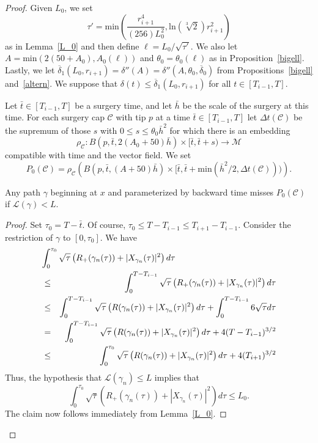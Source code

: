 \begin{proof}
Given $L_0$, we set
$$\tau'=\mathrm{min}\left(\frac{r_{i+1}^4}{(256)L_0^2},\mathrm{ln}(\sqrt[3]{2})r_{i+1}^2\right)$$
as in Lemma~\ref{L_0} and then define $\ell=L_0/\sqrt{\tau'}$. We
also let $A=\mathrm{min}(2(50+A_0),A_0(\ell))$ and
$\theta_0=\theta_0(\ell)$ as in Proposition~\ref{bigell}. Lastly, we
let
$\overline\delta_1(L_0,r_{i+1})=\delta''(A)=\delta''(A,\theta_0,\overline\delta_0)$
from Propositions~\ref{bigell} and~\ref{altern}. We suppose that
$\delta(t)\le \overline\delta_1(L_0,r_{i+1})$ for all $t\in
[T_{i-1},T]$.

Let $\bar t\in [T_{i-1},T]$ be a surgery time, and let $\bar h$ be
the scale of the surgery at this time. For each surgery cap
${\mathcal C}$ with tip $p$ at a time $\bar t\in [T_{i-1},T]$ let
$\Delta t({\mathcal C})$ be the supremum of those $s$ with $0\le s\le \theta_0\bar
h^2$ for which there is an embedding
$$\rho_{\mathcal C}\colon
B(p,\bar t,2(A_0+50)\bar h)\times[\bar t,\bar t+s)\to{\mathcal M}$$
compatible with time and the vector field. We set
$$P_0({\mathcal C})=\rho_{\mathcal C}\left(B(p,\bar t,(A+50)\bar h)\times
[\bar t,\bar t+\mathrm{min}(\bar h^2/2,\Delta t({\mathcal C})))\right).$$

\begin{claim}
\label{claim:path-misses-P0-cap-neighborhood} Any path $\gamma$ beginning at $x$ and parameterized by backward
time misses $P_0({\mathcal C})$ if ${\mathcal L}(\gamma)<L$.
\end{claim}

\begin{proof}
Set $\tau_0=T-\bar t$. Of course, $\tau_0\le T-T_{i-1}\le T_{i+1}-T_{i-1}$.
Consider the restriction of $\gamma$ to $[0,\tau_0]$.
We have
\begin{eqnarray*}
\lefteqn{\int_0^{\tau_0}\sqrt{\tau}\left(R_+(\gamma_n(\tau))+|X_{\gamma_n}(\tau)|^2\right)d\tau
}  \\
& \le &
\int_0^{T-T_{i-1}}\sqrt{\tau}\left(R_+(\gamma_n(\tau))+|X_{\gamma_n}(\tau)|^2\right)d\tau \\
& \le & \int_0^{T-T_{i-1}}\sqrt{\tau}\left(R(\gamma_n(\tau))+|X_{\gamma_n}(\tau)|^2\right)d\tau+
\int_0^{T-T_{i-1}}
6\sqrt{\tau}d\tau \\
& = &
\int_0^{T-T_{i-1}}\sqrt{\tau}\left(R(\gamma_n(\tau))+|X_{\gamma_n}(\tau)|^2\right)d\tau
+4(T-T_{i-1})^{3/2}
\\
& \le &
\int_0^{\tau_0}\sqrt{\tau}\left(R(\gamma_n(\tau))+|X_{\gamma_n}(\tau)|^2\right)d\tau+4(T_{i+1})^{3/2}
\end{eqnarray*}
Thus, the hypothesis that ${\mathcal L}(\gamma_n)\le L$ implies that
\begin{equation}\label{L'ineq}
\int_0^{\tau_0}\sqrt{\tau}\left(R_+(\gamma_n(\tau))+|X_{\gamma_n}(\tau)|^2\right)d\tau\le
L_0.\end{equation}
The claim now follows immediately from Lemma~\ref{L_0}.
\end{proof}


\end{proof}
